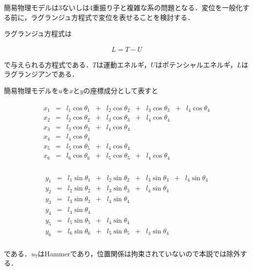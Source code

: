 簡易物理モデルは3ないしは4重振り子と複雑な系の問題となる．変位を一般化する前に，ラグランジュ方程式で変位を表せることを検討する．

ラグランジュ方程式は

\begin{eqnarray}
    L = T - U    
\end{eqnarray}

で与えられる方程式である．$T$は運動エネルギ，$U$はポテンシャルエネルギ，$L$はラグランジアンである．

簡易物理モデルを$u$を$x$と$y$の座標成分として表すと

\begin{eqnarray}
    \begin{matrix}
        x_1 &=& l_1 \cos \theta_1 &+& l_2 \cos \theta_2 &+& l_3 \cos \theta_3 &+& l_4 \cos \theta_4\\
        x_2 &=& l_2 \cos \theta_2 &+& l_3 \cos \theta_3 &+& l_4 \cos \theta_4 & & \\
        x_3 &=& l_3 \cos \theta_3 &+& l_4 \cos \theta_4 & & & &\\
        x_4 &=& l_4 \cos \theta_4 & & & & & &\\
        x_5 &=& l_5 \cos \theta_5 &+& l_4 \cos \theta_4 & & & &\\
        x_6 &=& l_6 \cos \theta_6 &+& l_5 \cos \theta_5 &+& l_4 \cos \theta_4 & &\\
    \end{matrix}
\end{eqnarray}

\begin{eqnarray}
    \begin{matrix}
        y_1 &=& l_1 \sin \theta_1 &+& l_2 \sin \theta_2 &+& l_3 \sin \theta_3 &+& l_4 \sin \theta_4\\
        y_2 &=& l_2 \sin \theta_2 &+& l_3 \sin \theta_3 &+& l_4 \sin \theta_4 & & \\
        y_3 &=& l_3 \sin \theta_3 &+& l_4 \sin \theta_4 & & & &\\
        y_4 &=& l_4 \sin \theta_4 & & & & & &\\
        y_5 &=& l_5 \sin \theta_5 &+& l_4 \sin \theta_4 & & & &\\
        y_6 &=& l_6 \sin \theta_6 &+& l_5 \sin \theta_5 &+& l_4 \sin \theta_4 & & \\
    \end{matrix}
\end{eqnarray}

である．$u_7$はHammerであり，位置関係は拘束されていないので本説では除外する．

